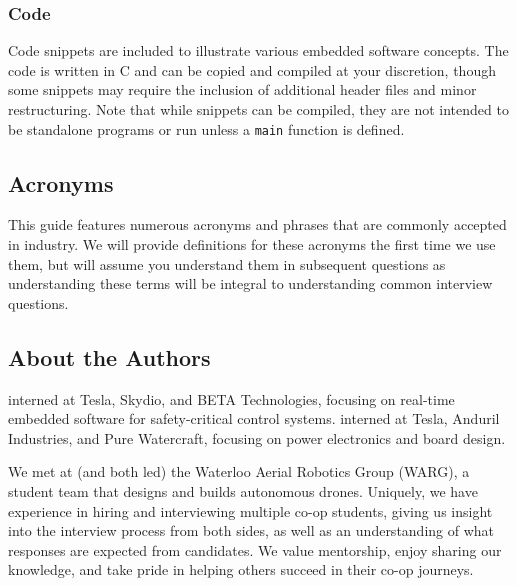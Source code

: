 \documentclass[main.tex]{subfiles}
\begin{document}
\subsubsection{Code}
Code snippets are included to illustrate various embedded software concepts. The code is written in C and can be copied and compiled at your discretion, though some snippets may require the inclusion of additional header files and minor restructuring. Note that while snippets can be compiled, they are not intended to be standalone programs or run unless a \texttt{main} function is defined.

\subsection{Acronyms}
This guide features numerous acronyms and phrases that are commonly accepted in industry. We will provide definitions for these acronyms the first time we use them, but will assume you understand them in subsequent questions as understanding these terms will be integral to understanding common interview questions. 

\newpage
\subsection{About the Authors}
 interned at Tesla, Skydio, and BETA Technologies, focusing on real-time embedded software for safety-critical control systems.
\newline
\newline
{} interned at Tesla, Anduril Industries, and Pure Watercraft, focusing on power electronics and board design. \newline

\newnoindentpara We met at (and both led) the Waterloo Aerial Robotics Group (WARG), a student team that designs and builds autonomous drones. Uniquely, we have experience in hiring and interviewing multiple co-op students, giving us insight into the interview process from both sides, as well as an understanding of what responses are expected from candidates. We value mentorship, enjoy sharing our knowledge, and take pride in helping others succeed in their co-op journeys.
\end{document}
